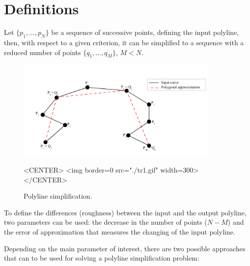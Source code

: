 \section{Definitions}

Let $\{p_1, \ldots, p_N\}$ be a sequence of successive points, defining the
input polyline, then, with respect to a given criterion, it can be
simplified to a sequence with a reduced number of points $\{q_1,\ldots, q_M\}$, $M<N$.

\begin{figure}[h]
\begin{ccTexOnly}
\begin{center}
\includegraphics[width=10cm]{Polygonal_approximation_d/fig1} 
\end{center}
\end{ccTexOnly}
\caption{Polyline simplification.
\label{Simplification_Fig_intor}}
\begin{ccHtmlOnly}
<CENTER>
<img border=0 src="./tr1.gif" width=300>
</CENTER>
\end{ccHtmlOnly}
\end{figure} 

To define the differences (roughness) between the input and the output
polyline, two parameters can be used: the
decrease in the number of points  ($N-M$)
and the error of approximation that measures the changing of the input
polyline.  

Depending on the main parameter of interest, there are two possible
approaches that can to be used for solving a polyline simplification
problem: 

